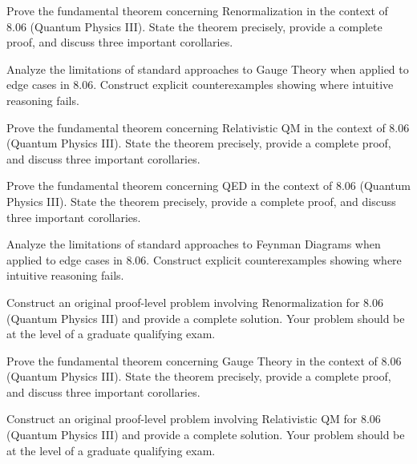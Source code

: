 \documentclass[12pt,a4paper]{exam}
\begin{document}
\begin{questions}
\vspace{0.3cm}

\question[4]
Prove the fundamental theorem concerning Renormalization in the context of 8.06 (Quantum Physics III). State the theorem precisely, provide a complete proof, and discuss three important corollaries.

\vspace{0.3cm}

\question[3]
Analyze the limitations of standard approaches to Gauge Theory when applied to edge cases in 8.06. Construct explicit counterexamples showing where intuitive reasoning fails.

\vspace{0.3cm}

\question[4]
Prove the fundamental theorem concerning Relativistic QM in the context of 8.06 (Quantum Physics III). State the theorem precisely, provide a complete proof, and discuss three important corollaries.

\vspace{0.3cm}

\question[3]
Prove the fundamental theorem concerning QED in the context of 8.06 (Quantum Physics III). State the theorem precisely, provide a complete proof, and discuss three important corollaries.

\vspace{0.3cm}

\question[4]
Analyze the limitations of standard approaches to Feynman Diagrams when applied to edge cases in 8.06. Construct explicit counterexamples showing where intuitive reasoning fails.

\vspace{0.3cm}

\question[3]
Construct an original proof-level problem involving Renormalization for 8.06 (Quantum Physics III) and provide a complete solution. Your problem should be at the level of a graduate qualifying exam.

\vspace{0.3cm}

\question[2]
Prove the fundamental theorem concerning Gauge Theory in the context of 8.06 (Quantum Physics III). State the theorem precisely, provide a complete proof, and discuss three important corollaries.

\vspace{0.3cm}

\question[3]
Construct an original proof-level problem involving Relativistic QM for 8.06 (Quantum Physics III) and provide a complete solution. Your problem should be at the level of a graduate qualifying exam.


\end{questions}
\end{document}
